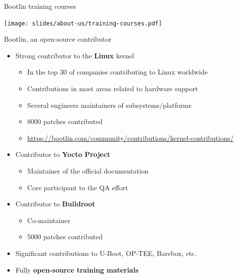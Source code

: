 \begin{frame}{Bootlin training courses}
  \begin{center}
    \texttt{[image: slides/about-us/training-courses.pdf]}
  \end{center}
\end{frame}

\begin{frame}{Bootlin, an open-source contributor}
  \begin{itemize}
  \item Strong contributor to the {\bf Linux} kernel
    \begin{itemize}
    \item In the top 30 of companies contributing to Linux worldwide
    \item Contributions in most areas related to hardware support
    \item Several engineers maintainers of subsystems/platforms
    \item 8000 patches contributed
    \item \url{https://bootlin.com/community/contributions/kernel-contributions/}
    \end{itemize}
  \item Contributor to {\bf Yocto Project}
    \begin{itemize}
    \item Maintainer of the official documentation
    \item Core participant to the QA effort
    \end{itemize}
  \item Contributor to {\bf Buildroot}
    \begin{itemize}
    \item Co-maintainer
    \item 5000 patches contributed
    \end{itemize}
  \item Significant contributions to U-Boot, OP-TEE, Barebox, etc.
  \item Fully {\bf open-source training materials}
  \end{itemize}
\end{frame}

